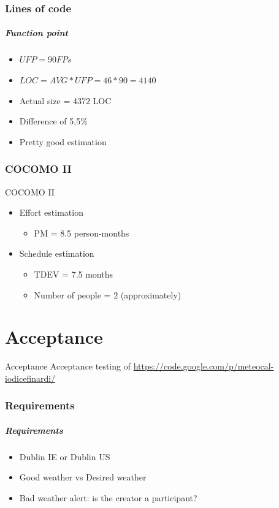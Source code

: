 \documentclass[professionalfonts]{beamer}
\begin{document}
\section{Lines of code}
\begin{frame}
\frametitle{Function point}
\begin{itemize}
\item<1-> $UFP = 90 FPs$
\item<1-> $LOC = AVG*UFP = 46*90 = 4140$
\item<2-> Actual size = 4372 LOC
\item<2-> Difference of 5,5\%
\item<2-> \alert{Pretty good estimation} 
\end{itemize}
\end{frame}

\section{COCOMO II}
\begin{frame}{COCOMO II}
\begin{itemize}
\item Effort estimation
\begin{itemize}
\item PM = 8.5 person-months
\end{itemize}
\item Schedule estimation
\begin{itemize}
\item TDEV = 7.5 months
\item Number of people = 2 (approximately)
\end{itemize}
\end{itemize}
\end{frame}

\part{Acceptance}
\label{part:Acceptance}
\begin{frame}{Acceptance}
Acceptance testing of \url{https://code.google.com/p/meteocal-iodicefinardi/}
\end{frame}

\section{Requirements}
\begin{frame}
\frametitle{Requirements}
\begin{itemize}
\item Dublin IE or Dublin US
\item Good weather vs Desired weather
\item Bad weather alert: is the creator a participant?
\end{itemize}
\end{frame}
\end{document}
